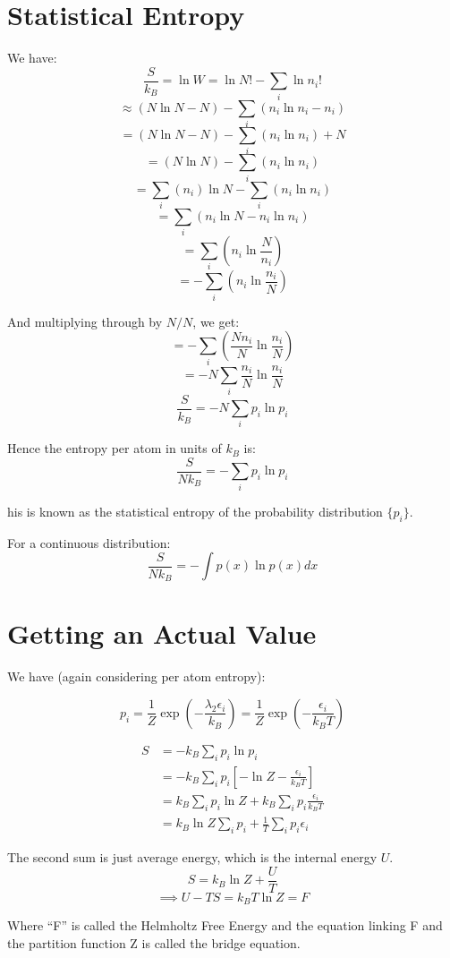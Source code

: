 \section{Statistical Entropy}
We have:
\[
    \frac{S}{k_B} = \ln W = \ln N! - \sum_{i}^{} \ln n_i!
\]
\[
    \approx (N \ln N - N) - \sum_i \left(n_i \ln n_i - n_i\right)
\]
\[
    = (N \ln N - N) - \sum_i \left(n_i \ln n_i\right) + N
\]
\[
    =( N \ln N) - \sum_i \left(n_i \ln n_i\right)
\]
\[
    = \sum_i (n_i) \ln N -  \sum_i \left(n_i \ln n_i\right)
\]
\[
    = \sum_i \left(n_i \ln N - n_i \ln n_i\right)
\]
\[
    = \sum_i \left(n_i \ln \frac{N}{n_i}\right)
\]
\[
    = -\sum_i \left(n_i \ln \frac{n_i}{N}\right)
\]

And multiplying through by $N/N$, we get:
\[
    = - \sum_i \left(\frac{N n_i}{N} \ln \frac{n_i}{N}\right)
\]
\[
    = - N \sum_i \frac{n_i}{N} \ln \frac{n_i}{N}
\]
\[
   {\frac{S}{k_B} = - N \sum_i p_i \ln p_i}
\]

Hence the entropy per atom in units of $k_B$ is:
\[
    \boxed{\frac{S}{N k_B} = - \sum_i p_i \ln p_i}
\]

his is known as the statistical entropy of the probability distribution $\{p_i\}$.

For a continuous distribution:
\[
    \frac{S}{N k_B} = - \int p(x) \ln p(x) dx
\]

\section{Getting an Actual Value}
We have (again considering per atom entropy):

\[
    p_i = \frac{1}{Z} \exp \left(- \frac{\lambda_2 \epsilon_i}{k_B}\right) = \frac{1}{Z} \exp \left(- \frac{\epsilon_i}{k_B T}\right)
\]

\begin{align*}
    S &= -k_B \sum_i p_i \ln p_i \\
      &= -k_B \sum_i p_i \left[ -\ln Z - \frac{\epsilon_i}{k_B T} \right] \\
      &= k_B \sum_i p_i \ln Z + k_B \sum_i p_i \frac{\epsilon_i}{k_B T} \\
      &= k_B \ln Z \sum_i p_i + \frac{1}{T} \sum_i p_i \epsilon_i
\end{align*}

The second sum is just average energy, which is the internal energy $U$.
\[
    S = k_B \ln Z + \frac{U}{T} 
\]
\[
    \implies U - TS = k_B T \ln Z = F
\]

Where ``F'' is called the Helmholtz Free Energy and the equation linking F and the partition function Z is called the bridge equation.

